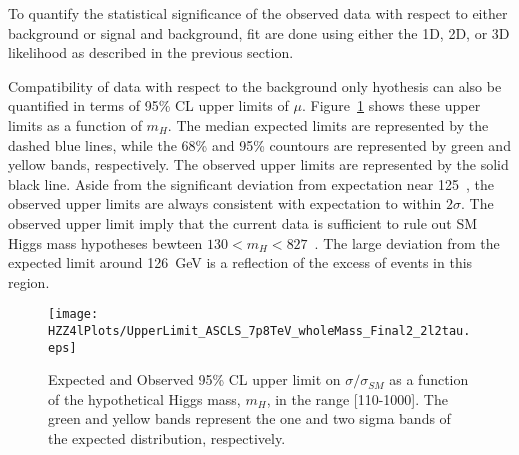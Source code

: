 

To quantify the statistical significance of the observed data
with respect to either background or signal and background, 
fit are done using either the 1D, 2D, or 3D likelihood as 
described in the previous section.  

Compatibility of data with respect to the background only
hyothesis can also be quantified in terms of 95\% CL upper
limits of $\mu$.  
Figure~\ref{fig:HZZ4lUpperLimits} shows these upper limits as
a function of $m_H$.  The median expected limits are represented
by the dashed blue lines, while the 68\% and 95\% countours are 
represented by green and yellow bands, respectively.  The 
observed upper limits are represented by the solid black line. 
Aside from the significant deviation
from expectation near 125~\GeV, the observed upper limits are 
always consistent with expectation to within $2\sigma$.  The
observed upper limit imply that the current data is sufficient
to rule out SM Higgs mass hypotheses bewteen $130<m_{H}<827$~\GeV.
The large deviation from the expected limit around 126~GeV is 
a reflection of the excess of events in this region.  

\begin{figure}
\begin{center}
\texttt{[image: HZZ4lPlots/UpperLimit\_ASCLS\_7p8TeV\_wholeMass\_Final2\_2l2tau.eps]}
\caption{Expected and Observed 95\% CL upper limit on
$\sigma/\sigma_{SM}$ as a function of the hypothetical 
Higgs mass, $m_H$, in the range [110-1000].
The green and yellow bands represent
the one and two sigma bands of the expected distribution, 
respectively.}
\label{fig:HZZ4lUpperLimits}
\end{center}
\end{figure}

